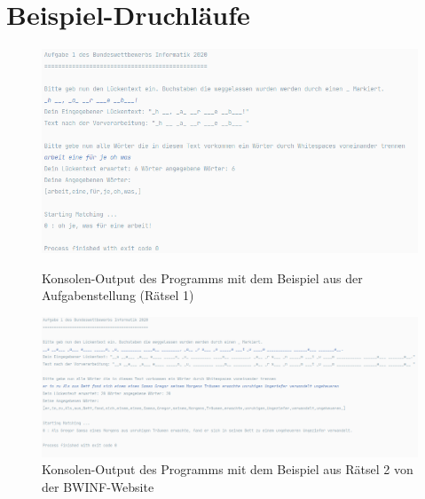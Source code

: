 \documentclass{article}
\begin{document}
\newpage

\section*{Beispiel-Druchläufe}

\begin{figure}[h]
	\center
	\includegraphics[width=1.0\textwidth]{aufgabe_example_ver1.png}
	\caption{Konsolen-Output des Programms mit dem Beispiel aus der Aufgabenstellung (Rätsel 1)}
	
	\vspace{0.5cm}
	\includegraphics[width=1.0\textwidth]{aufgabe_example.png}
	\caption{Konsolen-Output des Programms mit dem Beispiel aus Rätsel 2 von der BWINF-Website}
\end{figure}
\end{document}
